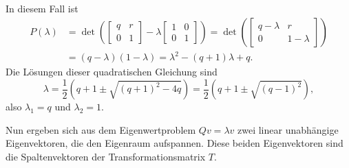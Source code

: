 \documentclass[a4paper,12pt,fleqn,twoside]{article}
\numberwithin{equation}{section}
\theoremstyle{definition}
\begin{document}
In diesem Fall ist
\[\begin{split}
P(\lambda) &= \det\left(\begin{bmatrix}
q & r\\
0 & 1
\end{bmatrix}-\lambda\begin{bmatrix}
1 & 0\\
0 & 1
\end{bmatrix}\right)
= \det\left(\begin{bmatrix}
q-\lambda & r\\
0 & 1-\lambda
\end{bmatrix}\right)\\
&= (q-\lambda)(1-\lambda)
= \lambda^2 -(q+1)\lambda+q.\end{split}
\]
Die Lösungen dieser quadratischen Gleichung sind
\[\lambda = \frac{1}{2}(q+1\pm\sqrt{(q+1)^2-4q})
= \frac{1}{2}(q+1\pm\sqrt{(q-1)^2}),\]
also $\lambda_1 = q$ und $\lambda_2=1.$

Nun ergeben sich aus dem Eigenwertproblem $Qv = \lambda v$ zwei linear
unabhängige Eigenvektoren, die den Eigenraum aufspannen. Diese beiden
Eigenvektoren sind die Spaltenvektoren der Transformationsmatrix $T$.
\end{document}

